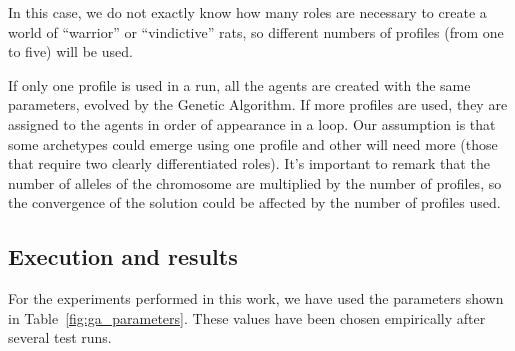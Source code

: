 \documentclass{sig-alternate}
\begin{document}

In this case,
 we do not exactly know how many roles are necessary to create a world of ``warrior'' or ``vindictive''
  rats, so different numbers of profiles (from one to five) will be used.



If only one profile is used
in a run, all the agents are created with the same parameters, evolved
by the Genetic Algorithm. If more profiles are used, they are assigned
to the agents in order of appearance in a loop. Our assumption is that
some archetypes could emerge using one profile and other will need
more (those that require two clearly differentiated roles). It's
important to remark that the number of alleles of the chromosome are
multiplied by the number of profiles, so the convergence of the
solution could be affected by the number of profiles used. 




\subsection{Execution and results}

For the experiments performed in this work, we have used the parameters shown in Table~\ref{fig:ga_parameters}. These values have been chosen empirically after several test runs.
\end{document}
